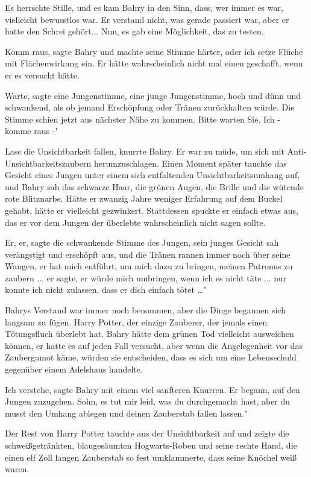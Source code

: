 Es herrschte Stille, und es kam Bahry in den Sinn, dass, wer immer es war,
vielleicht bewusstlos war. Er verstand nicht, was gerade passiert war, aber er
hatte den Schrei gehört... Nun, es gab eine Möglichkeit, das zu testen.

\glqq{}Komm raus\grqq{}, sagte Bahry und machte seine Stimme härter, \glqq{}oder
ich setze Flüche mit Flächenwirkung ein.\grqq{} Er hätte wahrscheinlich nicht
mal einen geschafft, wenn er es versucht hätte.

\glqq{}Warte\grqq{}, sagte eine Jungenstimme, eine junge Jungenstimme, hoch und
dünn und schwankend, als ob jemand Erschöpfung oder Tränen zurückhalten würde.
Die Stimme schien jetzt aus nächster Nähe zu kommen. \glqq{}Bitte warten Sie. Ich
- komme raus -"

\glqq{}Lass die Unsichtbarkeit fallen\grqq{}, knurrte Bahry. Er war zu müde, um
sich mit Anti-Unsichtbarkeitszaubern herumzuschlagen. Einen Moment später
tauchte das Gesicht eines Jungen unter einem sich entfaltenden
Unsichtbarkeitsumhang auf, und Bahry sah das schwarze Haar, die grünen Augen,
die Brille und die wütende rote Blitznarbe. Hätte er zwanzig Jahre weniger
Erfahrung auf dem Buckel gehabt, hätte er vielleicht gezwinkert. Stattdessen
spuckte er einfach etwas aus, das er vor dem Jungen der überlebte wahrscheinlich
nicht sagen sollte.

\glqq{}Er, er\grqq{}, sagte die schwankende Stimme des Jungen, sein junges
Gesicht sah verängstigt und erschöpft aus, und die Tränen rannen immer noch über
seine Wangen, \glqq{}er hat mich entführt, um mich dazu zu bringen, meinen
Patronus zu zaubern ... er sagte, er würde mich umbringen, wenn ich es nicht
täte ... nur konnte ich nicht zulassen, dass er dich einfach tötet …"

Bahrys Verstand war immer noch benommen, aber die Dinge begannen sich langsam zu
fügen. Harry Potter, der einzige Zauberer, der jemals einen Tötungsfluch
überlebt hat. Bahry hätte dem grünen Tod vielleicht ausweichen können, er hatte
es auf jeden Fall versucht, aber wenn die Angelegenheit vor das Zaubergamot
käme, würden sie entscheiden, dass es sich um eine Lebensschuld gegenüber einem
Adelshaus handelte.

\glqq{}Ich verstehe\grqq{}, sagte Bahry mit einem viel sanfteren Knurren. Er
begann, auf den Jungen zuzugehen. \glqq{}Sohn, es tut mir leid, was du
durchgemacht hast, aber du musst den Umhang ablegen und deinen Zauberstab fallen
lassen."

Der Rest von Harry Potter tauchte aus der Unsichtbarkeit auf und zeigte die
schweißgetränkten, blaugesäumten Hogwarts-Roben und seine rechte Hand, die einen
elf Zoll langen Zauberstab so fest umklammerte, dass seine Knöchel weiß waren.

